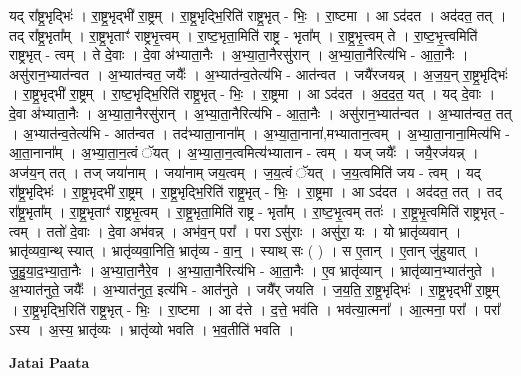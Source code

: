 \documentclass[17pt]{extarticle}
\begin{document}
यद् रा᳚ष्ट्र॒भृद्भिः॑ । रा॒ष्ट्र॒भृद्भी॑ रा॒ष्ट्रम् । रा॒ष्ट्र॒भृद्भि॒रिति॑ राष्ट्र॒भृत् - भिः॒ । रा॒ष्टमा । आ ऽद॑दत । अद॑दत॒ तत् । तद् रा᳚ष्ट्र॒भृता᳚म् । रा॒ष्ट्र॒भृताꣳ॑ राष्ट्रभृ॒त्त्वम् । रा॒ष्ट॒भृता॒मिति॑ राष्ट्र - भृता᳚म् । रा॒ष्ट्र॒भृ॒त्त्वम् ते । रा॒ष्ट॒भृ॒त्त्वमिति॑ राष्ट्रभृत् - त्वम् । ते दे॒वाः । दे॒वा अ॑भ्याता॒नैः । अ॒भ्या॒ता॒नैरसु॑रान् । अ॒भ्या॒ता॒नैरित्य॑भि - आ॒ता॒नैः । असु॑रान॒भ्यात॑न्वत । अ॒भ्यात॑न्वत॒ जयैः᳚ । अ॒भ्यात॑न्व॒तेत्य॑भि - आत॑न्वत । 
जयै॑रजयन्न् । अ॒ज॒य॒न् रा॒ष्ट्र॒भृद्भिः॑ । रा॒ष्ट्र॒भृद्भी॑ रा॒ष्ट्रम् । रा॒ष्ट॒भृद्भि॒रिति॑ राष्ट्र॒भृत् - भिः॒ । रा॒ष्ट्रमा । आ ऽद॑दत । अ॒द॒द॒त॒ यत् । यद् दे॒वाः । दे॒वा अ॑भ्याता॒नैः । अ॒भ्या॒ता॒नैरसु॑रान् । अ॒भ्या॒ता॒नैरित्य॑भि - आ॒ता॒नैः । असु॑रान॒भ्यात॑न्वत । अ॒भ्यात॑न्वत॒ तत् । अ॒भ्यात॑न्व॒तेत्य॑भि - आत॑न्वत । तद॑भ्याता॒नाना᳚म् । अ॒भ्या॒ता॒नाना॑,मभ्यातान॒त्वम् । अ॒भ्या॒ता॒नाना॒मित्य॑भि - आ॒ता॒नाना᳚म् । अ॒भ्या॒ता॒न॒त्वं ॅयत् । अ॒भ्या॒ता॒न॒त्वमित्य॑भ्यातान - त्वम् । यज् जयैः᳚ । जयै॒रज॑यन्न् । अज॑य॒न् तत् । तज् जया॑नाम् । जया॑नाम् जय॒त्वम् । ज॒य॒त्वं ॅयत् । ज॒य॒त्वमिति॑ जय - त्वम् । यद् रा᳚ष्ट्र॒भृद्भिः॑ । रा॒ष्ट्र॒भृद्भी॑ रा॒ष्ट्रम् । रा॒ष्ट्र॒भृद्भि॒रिति॑ राष्ट्र॒भृत् - भिः॒ । रा॒ष्ट्रमा । आ ऽद॑दत । अद॑दत॒ तत् । तद् रा᳚ष्ट्र॒भृता᳚म् । रा॒ष्ट्र॒भृताꣳ॑ राष्ट्रभृ॒त्वम् । रा॒ष्ट्र॒भृता॒मिति॑ राष्ट्र - भृता᳚म् । रा॒ष्ट॒भृ॒त्वम् ततः॑ । रा॒ष्ट्र॒भृ॒त्वमिति॑ राष्ट्रभृत् - त्वम् । ततो॑ दे॒वाः । दे॒वा अभ॑वन्न् । अभ॑व॒न् परा᳚ । परा ऽसु॑राः । असु॑रा॒ यः । यो भ्रातृ॑व्यवान् । भ्रातृ॑व्यवा॒न्थ् स्यात् । भ्रातृ॑व्यवा॒निति॒ भ्रातृ॑व्य - वा॒न्॒ । स्याथ् सः ( ) । स ए॒तान् । ए॒तान् जु॑हुयात् । जु॒हु॒या॒द॒भ्या॒ता॒नैः । अ॒भ्या॒ता॒नैरे॒व । अ॒भ्या॒ता॒नैरित्य॑भि - आ॒ता॒नैः । ए॒व भ्रातृ॑व्यान् । भ्रातृ॑व्यान॒भ्यात॑नुते । अ॒भ्यात॑नुते॒ जयैः᳚ । अ॒भ्यात॑नुत॒ इत्य॑भि - आत॑नुते । जयै᳚र् जयति । ज॒य॒ति॒ रा॒ष्ट्र॒भृद्भिः॑ । रा॒ष्ट्र॒भृद्भी॑ रा॒ष्ट्रम् । रा॒ष्ट्र॒भृद्भि॒रिति॑ राष्ट्र॒भृत् - भिः॒ । रा॒ष्टमा । आ द॑त्ते । द॒त्ते॒ भव॑ति । भव॑त्या॒त्मना᳚ । आ॒त्मना॒ परा᳚ । परा᳚ ऽस्य । अ॒स्य॒ भ्रातृ॑व्यः । भ्रातृ॑व्यो भवति । भ॒व॒तीति॑ भवति । \newline

\textbf{Jatai Paata} \newline
\end{document}
